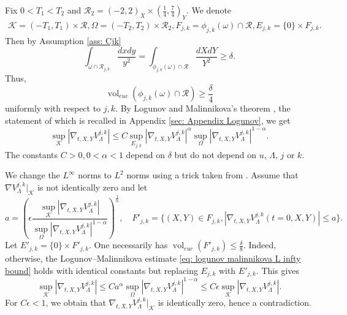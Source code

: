 \documentclass[letterpaper,11pt]{amsart}
\theoremstyle{note}
\numberwithin{equation}{section}
\DeclareMathOperator{\vol}{vol}
\begin{document}
Fix $0 < T_1 < T_2$ and $\mathcal{R}_2 = (-2, 2)_X \times (\frac{1}{4}, \frac{7}{4})_Y$. We denote \begin{multline}
    \label{eq: logunov-malinnikova sets (t, X, Y)} \mathcal{K} = (-T_1, T_1) \times \mathcal{R}, \Omega = (-T_2, T_2) \times \mathcal{R}_2, F_{j,k} = \phi_{j,k}(\omega) \cap \mathcal{R}, E_{j,k} = \{0\} \times F_{j,k}.
\end{multline} Then by Assumption \ref{ass: Cjk} $$\int_{\omega \cap \mathcal{R}_{j,k}} \frac{dxdy}{y^2} = \int_{\phi_{j,k}(\omega) \cap \mathcal{R}} \frac{dXdY}{Y^2} \geq \delta.$$ Thus, \begin{equation}
\label{eq: lower bound after scaling}
\vol_{euc}(\phi_{j,k}(\omega) \cap \mathcal{R}) \geq \frac{\delta}{4}\end{equation} uniformly with respect to $j,k$. By Logunov and Malinnikova's theorem \cite[Theorem 5.1]{logunovmalinnikova2018qtttve_propag_smallness}, the statement of which is recalled in Appendix \ref{sec: Appendix Logunov}, we get \begin{equation}
    \label{eq: logunov malinnikova L infty bound}
    \sup_{\mathcal{K}} |\nabla_{t,X,Y} V_\Lambda^{j,k}| \leq C \sup_{E_{j,k}} |\nabla_{t,X,Y} V_\Lambda^{j,k}|^\alpha \sup_{\Omega} |\nabla_{t,X,Y} V_\Lambda^{j,k}|^{1-\alpha}.
\end{equation}  The constants $C > 0, 0 < \alpha < 1$ depend on $\delta$ but do not depend on $u$, $\Lambda$, $j$ or $k$.

We change the $L^\infty$ norms to $L^2$ norms using a trick taken from \cite[Section 2]{burqmoyano2021spectralestimates}. Assume that $\nabla V_\Lambda^{j,k}|_\mathcal{K}$ is not identically zero and let $$a = \left( \epsilon \frac{\sup_{\mathcal{K}} |\nabla_{t,X,Y} V_\Lambda^{j,k}|}{\sup_{\Omega} |\nabla_{t,X,Y} V_\Lambda^{j,k}|^{1-\alpha}} \right)^\frac{1}{\alpha}, \quad F'_{j,k} = \{(X,Y) \in F_{j,k}, |\nabla_{t,X,Y} V_\Lambda^{j,k}(t=0, X, Y)| \leq a\}.$$ Let $E'_{j,k} = \{0\} \times F'_{j,k}$. One necessarily has $\vol_{euc}(F'_{j,k}) \leq \frac{\delta}{8}$. Indeed, otherwise, the Logunov--Malinnikova estimate \eqref{eq: logunov malinnikova L infty bound} holds with identical constants but replacing $E_{j,k}$ with $E'_{j,k}$. This gives \begin{equation}
    \sup_{\mathcal{K}} |\nabla_{t,X,Y} V_\Lambda^{j,k}| \leq C a^\alpha  \sup_\Omega |\nabla_{t,X,Y} V_\Lambda^{j,k}|^{1-\alpha} \leq C\epsilon \sup_{\mathcal{K}} |\nabla_{t,X,Y} V_\Lambda^{j,k}|.
\end{equation} For $C\epsilon < 1$, we obtain that $\nabla_{t,X,Y} V_\Lambda^{j,k}|_\mathcal{K}$ is identically zero, hence a contradiction.
\end{document}
